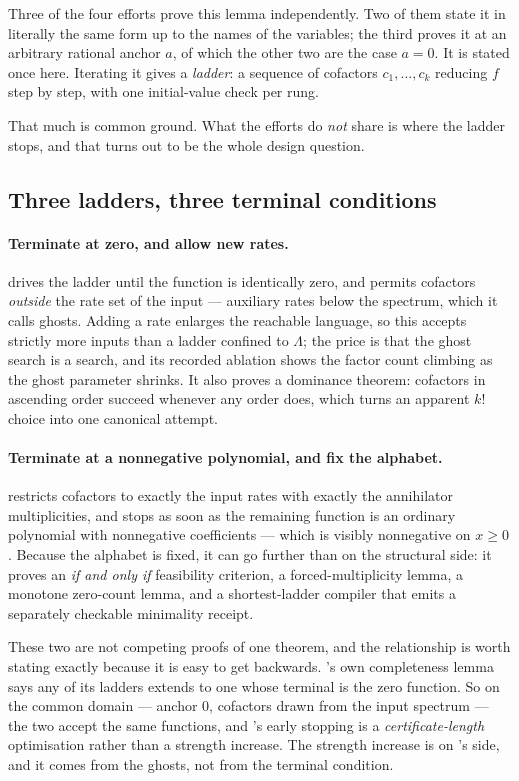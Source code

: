 Three of the four efforts prove this lemma independently. Two of them state it
in literally the same form up to the names of the variables; the third proves
it at an arbitrary rational anchor $a$, of which the other two are the case
$a=0$. It is stated once here. Iterating it gives a \emph{ladder}: a sequence of
cofactors $c_1,\ldots,c_k$ reducing $f$ step by step, with one initial-value
check per rung.

That much is common ground. What the efforts do \emph{not} share is where the
ladder stops, and that turns out to be the whole design question.

\subsection{Three ladders, three terminal conditions}

\paragraph{Terminate at zero, and allow new rates.}  drives the ladder
until the function is identically zero, and permits cofactors \emph{outside} the
rate set of the input --- auxiliary rates below the spectrum, which it calls
ghosts. Adding a rate enlarges the reachable language, so this accepts strictly
more inputs than a ladder confined to $\Lambda$; the price is that the ghost
search is a search, and its recorded ablation shows the factor count climbing as
the ghost parameter shrinks. It also proves a dominance theorem: cofactors in
ascending order succeed whenever any order does, which turns an apparent
$k!$ choice into one canonical attempt.

\paragraph{Terminate at a nonnegative polynomial, and fix the alphabet.}
 restricts cofactors to exactly the input rates with exactly the
annihilator multiplicities, and stops as soon as the remaining function is an
ordinary polynomial with nonnegative coefficients --- which is visibly
nonnegative on $x\ge0$. Because the alphabet is fixed, it can go further than
 on the structural side: it proves an \emph{if and only if} feasibility
criterion, a forced-multiplicity lemma, a monotone zero-count lemma, and a
shortest-ladder compiler that emits a separately checkable minimality receipt.

These two are not competing proofs of one theorem, and the relationship is worth
stating exactly because it is easy to get backwards. 's own completeness
lemma says any of its ladders extends to one whose terminal is the zero
function. So on the common domain --- anchor $0$, cofactors drawn from the input
spectrum --- the two accept the same functions, and 's early stopping is
a \emph{certificate-length} optimisation rather than a strength increase. The
strength increase is on 's side, and it comes from the ghosts, not from
the terminal condition.

